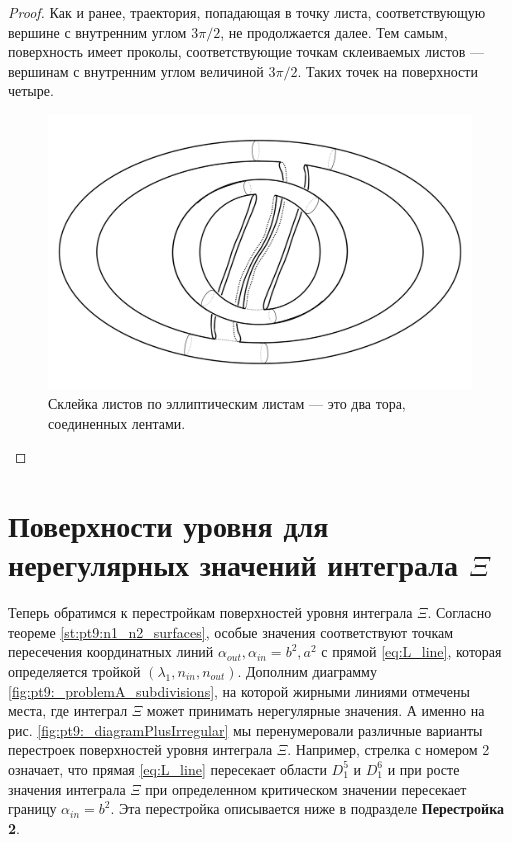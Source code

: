 \begin{proof}
Как и ранее, траектория, попадающая в точку листа, соответствующую вершине с внутренним углом $3\pi / 2$, не продолжается далее.  %
Тем самым, поверхность имеет проколы, соответствующие точкам склеиваемых листов --- вершинам с внутренним углом величиной $3\pi / 2$. 
Таких точек на поверхности четыре. %
\begin{figure}[!ht]
\centering
\includegraphics[scale=0.08]{images/ch4/section2/ell_and_hyp2_transformations.pdf}
    \caption{Склейка листов по эллиптическим листам --- это два тора, соединенных лентами.}
    \label{fig:pt9:_ell_and_hyp2_transformations}
\end{figure}
\end{proof}

\section{Поверхности уровня для нерегулярных значений интеграла $\Xi$}\label{sec:ch4/sec2}
Теперь обратимся к перестройкам поверхностей уровня интеграла $\Xi$. 
Согласно теореме \ref{st:pt9:n1_n2_surfaces}, особые значения соответствуют точкам пересечения координатных линий $\alpha_{out}, \alpha_{in} = b^2, a^2$ с прямой \eqref{eq:L_line}, которая определяется тройкой $(\lambda_1, n_{in}, n_{out})$.
Дополним диаграмму  \ref{fig:pt9:_problemA_subdivisions}, на которой жирными линиями отмечены места, где интеграл $\Xi$ может принимать нерегулярные значения. А именно на рис. \ref{fig:pt9:_diagramPlusIrregular} мы перенумеровали различные варианты перестроек поверхностей уровня интеграла $\Xi$. 
Например, стрелка с номером 2 означает, что прямая \eqref{eq:L_line} пересекает области $D_1^5$ и $D_1^6$ и при росте значения интеграла $\Xi$ при определенном критическом значении пересекает границу $\alpha_{in} = b^2$. Эта перестройка описывается ниже в подразделе \textbf{Перестройка 2}.

